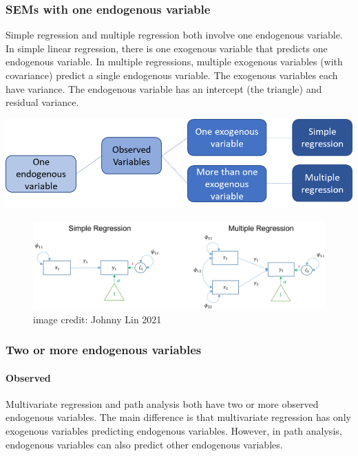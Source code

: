 \documentclass[
]{article}
\begin{document}
\hypertarget{sems-with-one-endogenous-variable}{%
\subsubsection{SEMs with one endogenous
variable}\label{sems-with-one-endogenous-variable}}

Simple regression and multiple regression both involve one endogenous
variable. In simple linear regression, there is one exogenous variable
that predicts one endogenous variable. In multiple regressions, multiple
exogenous variables (with covariance) predict a single endogenous
variable. The exogenous variables each have variance. The endogenous
variable has an intercept (the triangle) and residual variance.

\includegraphics{SEMs1endogenous.png}

\begin{figure}
\centering
\includegraphics{Simple and Multiple Regression.png}
\caption{image credit: Johnny Lin 2021}
\end{figure}

\hypertarget{two-or-more-endogenous-variables}{%
\subsubsection{Two or more endogenous
variables}\label{two-or-more-endogenous-variables}}

\hypertarget{observed}{%
\paragraph{Observed}\label{observed}}

Multivariate regression and path analysis both have two or more observed
endogenous variables. The main difference is that multivariate
regression has only exogenous variables predicting endogenous variables.
However, in path analysis, endogenous variables can also predict other
endogenous variables.
\end{document}
